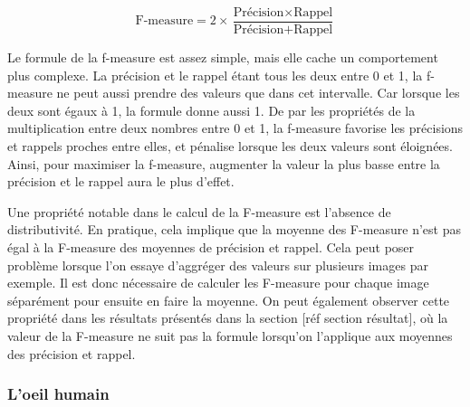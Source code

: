 	\begin{equation}
		\text{F-measure} = 2 \times \frac{\text{Précision} \times \text{Rappel}}{\text{Précision}+\text{Rappel}}
	\end{equation}

	Le formule de la f-measure est assez simple, mais elle cache un comportement plus complexe. La précision et le rappel étant tous les deux entre 0 et 1, la f-measure ne peut aussi prendre des valeurs que dans cet intervalle. Car lorsque les deux sont égaux à 1, la formule donne aussi 1. De par les propriétés de la multiplication entre deux nombres entre 0 et 1, la f-measure favorise les précisions et rappels proches entre elles, et pénalise lorsque les deux valeurs sont éloignées. Ainsi, pour maximiser la f-measure, augmenter la valeur la plus basse entre la précision et le rappel aura le plus d'effet.
	
	Une propriété notable dans le calcul de la F-measure est l'absence de distributivité. En pratique, cela implique que la moyenne des F-measure n'est pas égal à la F-measure des moyennes de précision et rappel. Cela peut poser problème lorsque l'on essaye d'aggréger des valeurs sur plusieurs images par exemple. Il est donc nécessaire de calculer les F-measure pour chaque image séparément pour ensuite en faire la moyenne. On peut également observer cette propriété dans les résultats présentés dans la section [réf section résultat], où la valeur de la F-measure ne suit pas la formule lorsqu'on l'applique aux moyennes des précision et rappel.

	\subsubsection{L'oeil humain}

